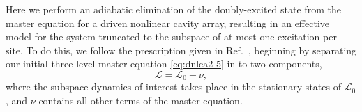 Here we perform an adiabatic elimination of the doubly-excited state from the master equation for a driven nonlinear cavity array, resulting in an effective model for the system truncated to the subspace of at most one excitation per site. To do this, we follow the prescription given in Ref.~\cite{Garcia-Ripoll2009}, beginning by separating our initial three-level master equation \cref{eq:dnlca2-5} in to two components,
\begin{equation}
	\mathcal{L} = \mathcal{L}_{0} + \nu,
	\label{eq:adelim1}
\end{equation}
where the subspace dynamics of interest takes place in the stationary states of \(\mathcal{L}_{0}\), and \(\nu\) contains all other terms of the master equation.
	